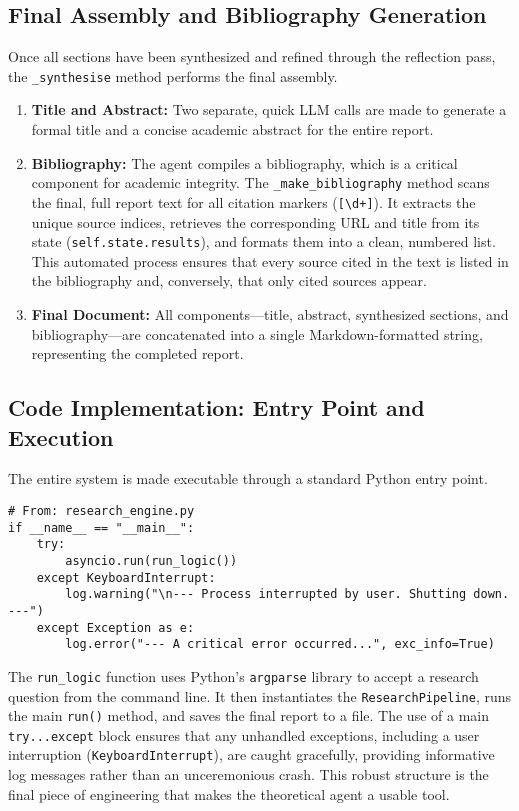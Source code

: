 \documentclass[12pt, a4paper]{article}
\begin{document}
\subsection{Final Assembly and Bibliography Generation}
Once all sections have been synthesized and refined through the reflection pass, the \texttt{\_synthesise} method performs the final assembly.
\begin{enumerate}
    \item \textbf{Title and Abstract:} Two separate, quick LLM calls are made to generate a formal title and a concise academic abstract for the entire report.
    \item \textbf{Bibliography:} The agent compiles a bibliography, which is a critical component for academic integrity. The \texttt{\_make\_bibliography} method scans the final, full report text for all citation markers (\texttt{[\textbackslash d+]}). It extracts the unique source indices, retrieves the corresponding URL and title from its state (\texttt{self.state.results}), and formats them into a clean, numbered list. This automated process ensures that every source cited in the text is listed in the bibliography and, conversely, that only cited sources appear.
    \item \textbf{Final Document:} All components---title, abstract, synthesized sections, and bibliography---are concatenated into a single Markdown-formatted string, representing the completed report.
\end{enumerate}

\subsection{Code Implementation: Entry Point and Execution}
The entire system is made executable through a standard Python entry point.
\begin{lstlisting}[style=myPython, label={The main CLI entry-point}]
# From: research_engine.py
if __name__ == "__main__":
    try:
        asyncio.run(run_logic())
    except KeyboardInterrupt:
        log.warning("\n--- Process interrupted by user. Shutting down. ---")
    except Exception as e:
        log.error("--- A critical error occurred...", exc_info=True)
\end{lstlisting}
The \texttt{run\_logic} function uses Python's \texttt{argparse} library to accept a research question from the command line. It then instantiates the \texttt{ResearchPipeline}, runs the main \texttt{run()} method, and saves the final report to a file. The use of a main \texttt{try...except} block ensures that any unhandled exceptions, including a user interruption (\texttt{KeyboardInterrupt}), are caught gracefully, providing informative log messages rather than an unceremonious crash. This robust structure is the final piece of engineering that makes the theoretical agent a usable tool.
\end{document}
